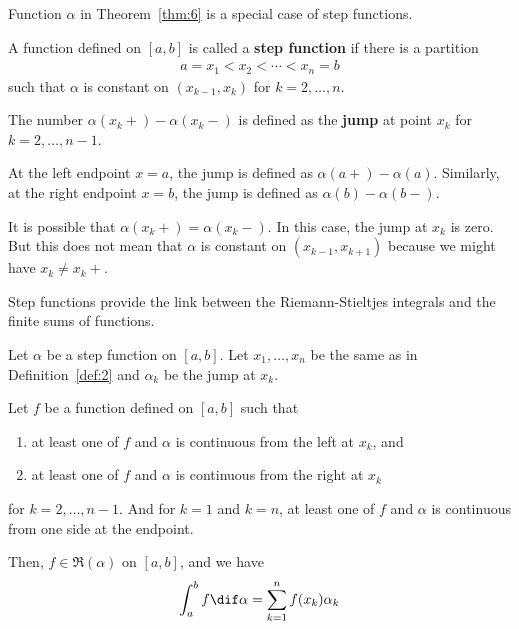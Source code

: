 \documentclass[thmcnt=section, color=blue, 12pt]{my-elegantbook}
\begin{document}
Function $\alpha$ in Theorem~\ref{thm:6} is a special case of step functions.

\begin{definition} \label{def:2}
	A function defined on $[a, b]$ is called
	a \textbf{step function}
	if there is a partition
	\begin{align*}
		a=x_1 < x_2 < \cdots < x_n = b
	\end{align*}
	such that $\alpha$ is constant on $(x_{k-1}, x_k)$ for $k=2, \ldots, n$.

	The number $\alpha(x_k+) - \alpha(x_k-)$ is defined as
	the \textbf{jump}
	at point $x_k$ for $k=2, \ldots, n-1$.

	At the left endpoint $x=a$, the jump is defined as $\alpha(a+) - \alpha(a)$.
	Similarly, at the right endpoint $x=b$, the jump is defined
	as $\alpha(b) - \alpha(b-)$.
\end{definition}

\begin{note}
	It is possible that $\alpha(x_k+) = \alpha(x_k -)$.
	In this case, the jump at $x_k$ is zero.
	But this does not mean that $\alpha$ is constant on $(x_{k-1}, x_{k+1})$
	because we might have $x_k \neq x_k+$.
\end{note}

Step functions provide the link between the Riemann-Stieltjes integrals
and the finite sums of functions.

\begin{theorem} \label{thm:7}
	Let $\alpha$ be a step function on $[a, b]$.
	Let $x_1, \ldots, x_n$ be the same as in Definition~\ref{def:2}
	and $\alpha_k$ be the jump at $x_k$.

	Let $f$ be a function defined on $[a, b]$ such that
	\begin{enumerate}
		\item at least one of $f$ and $\alpha$ is continuous from the left at $x_k$, and
		\item at least one of $f$ and $\alpha$ is continuous from the right at $x_k$
	\end{enumerate}
	for $k=2, \ldots, n-1$.
	And for $k=1$ and $k=n$, at least one of $f$ and $\alpha$
	is continuous from one side at the endpoint.

	Then, $f \in \mathfrak{R}(\alpha)$ on $[a, b]$, and we have
	\begin{align}
		\int_a^b f \dif \alpha =
		\sum_{k=1}^n f(x_k) \alpha_k
		\label{eq:27}
	\end{align}
\end{theorem}
\end{document}
